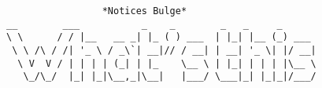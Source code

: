 \documentclass{article}
\begin{document}
\begin{verbatim}
                 *Notices Bulge*
__        ___           _    _        _   _     _
\ \      / / |__   __ _| |_ ( ) ___  | |_| |__ (_) ___
 \ \ /\ / /| '_ \ / _\`| __|// / __| | __| '_ \| |/ __|
  \ V  V / | | | | (_| | |_    \__ \ | |_| | | | |\__ \
   \_/\_/  |_| |_|\__,_|\__|   |___/ \___|_| |_|_|/___/
\end{verbatim}
\end{document}
